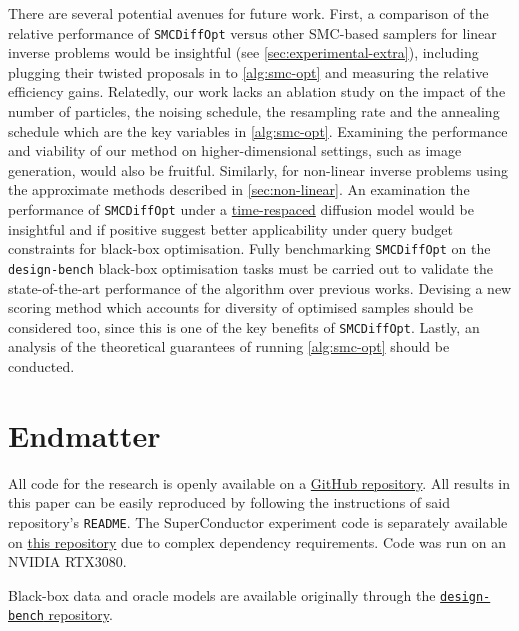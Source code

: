 There are several potential avenues for future work. First, a comparison of the relative performance
of \texttt{SMCDiffOpt} versus other SMC-based samplers
\parencite{cardosoMonteCarloGuided2023,douDiffusionPosteriorSampling2023,wuPracticalAsymptoticallyExact2023}
for linear inverse problems would be insightful (see \autoref{sec:experimental-extra}), including
plugging their twisted proposals in to \autoref{alg:smc-opt} and measuring the relative efficiency
gains. Relatedly, our work lacks an ablation study on the impact of the number of particles, the
noising schedule, the resampling rate and the annealing schedule which are the key variables in
\autoref{alg:smc-opt}. Examining the performance and viability of our method on higher-dimensional
settings, such as image generation, would also be fruitful. Similarly, for non-linear inverse
problems using the approximate methods described in \autoref{sec:non-linear}. An examination the
performance of \texttt{SMCDiffOpt} under a \hyperref[rem:time-respacing]{time-respaced} diffusion
model would be insightful and if positive suggest better applicability under query budget
constraints for black-box optimisation. Fully benchmarking \texttt{SMCDiffOpt} on the
\texttt{design-bench} black-box optimisation tasks must be carried out to validate the
state-of-the-art performance of the algorithm over previous works. Devising a new scoring method
which accounts for diversity of optimised samples should be considered too, since this is one of the
key benefits of \texttt{SMCDiffOpt}. Lastly, an analysis of the theoretical guarantees of running
\autoref{alg:smc-opt} should be conducted.

\section*{Endmatter}

All code for the research is openly available on a
\href{https://github.com/bd3dowling/diffusion-research}{GitHub repository}.
All results in this paper can be easily reproduced by following the instructions of said
repository's \texttt{README}. The SuperConductor experiment code is separately available on
\href{https://github.com/bd3dowling/superconductor}{this repository} due to complex dependency
requirements. Code was run on an NVIDIA RTX3080.

Black-box data and oracle models are available originally through the
\href{https://github.com/brandontrabucco/design-bench}{\texttt{design-bench} repository}.
